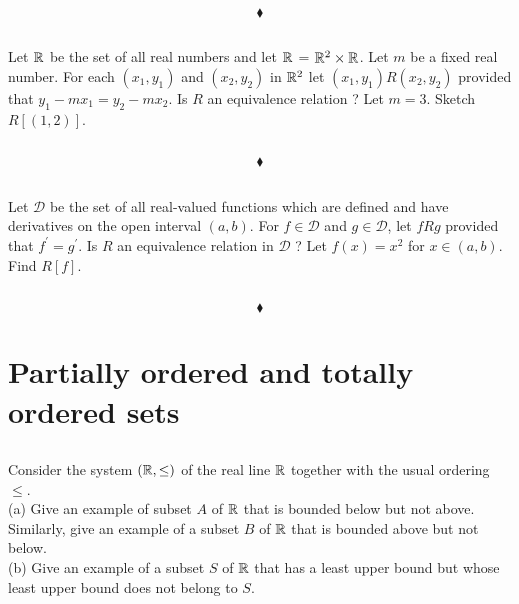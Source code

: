 $$\blacklozenge$$


\subsection{}
\begin{tcolorbox}
Let $\mathbb{R}_{}$ be the set of all real numbers and let $\mathbb{R}_{}$ = $\mathbb{R}_{}^2\times\mathbb{R}_{}$. Let $m$ be a fixed real number. For each $(x_1, y_1)$ and $(x_2, y_2)$ in $\mathbb{R}_{}^2$ let $(x_1, y_1) R (x_2, y_2)$ provided that $y_1 - mx_1= y_2 - mx_2$. Is $R$ an equivalence relation ? Let $m = 3$. Sketch $R[(1, 2)]$. 
\end{tcolorbox}
$$ $$

$$\blacklozenge$$



\subsection{}
\begin{tcolorbox}
Let $\mathscr{D}$ be the set of all real-valued functions which are defined and have derivatives on the open interval $(a, b)$. For $f\in \mathscr{D}$  and $g \in \mathscr{D}$, let $f R g$ provided that $f^{'} = g^{'}$. Is $R$ an equivalence relation in $\mathscr{D}$ ? Let $f(x) = x^2$ for $x \in (a, b)$. Find $R[f]$. 
\end{tcolorbox}
$$ $$

$$\blacklozenge$$


\newpage
\setcounter{section}{22}
\section{Partially ordered and totally ordered sets}
\subsection{}
\begin{tcolorbox}
Consider the system $(\mathbb{R}, \leq )$ of the real line $\mathbb{R}$ together with the usual ordering $\leq $.\\
 (a) Give an example of subset $A$ of $\mathbb{R}$  that is bounded below but not above. Similarly, give an example of a subset $B$ of $\mathbb{R}$ that is bounded above but not below.\\
(b) Give an example of a subset $S$ of $\mathbb{R}$ that has a least upper bound but whose least upper bound does not belong to $S$. 
\end{tcolorbox}
$$ $$

